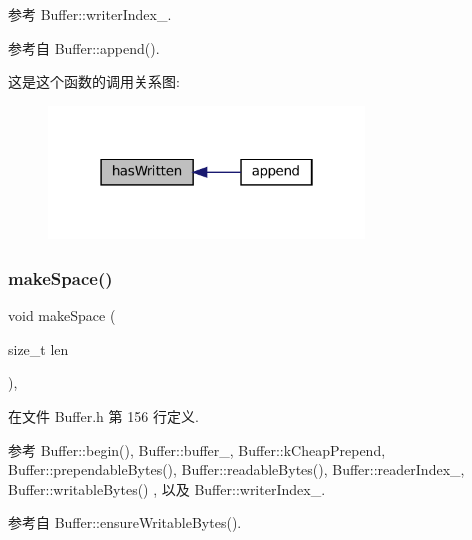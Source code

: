 参考 Buffer\+::writer\+Index\+\_\+.



参考自 Buffer\+::append().

这是这个函数的调用关系图\+:
\nopagebreak
\begin{figure}[H]
\begin{center}
\leavevmode
\includegraphics[width=238pt]{classmuduo_1_1Buffer_ae29d7ca8954d0ec7da6363221c80a245_icgraph}
\end{center}
\end{figure}
\mbox{\label{classmuduo_1_1Buffer_a83d5a5ce302569b35df7743314578791}} 
\subsubsection{\texorpdfstring{make\+Space()}{makeSpace()}}
{\footnotesize\ttfamily void make\+Space (\begin{DoxyParamCaption}\item[{size\+\_\+t}]{len }\end{DoxyParamCaption})\hspace{0.3cm}{\ttfamily [inline]}, {\ttfamily [private]}}



在文件 Buffer.\+h 第 156 行定义.



参考 Buffer\+::begin(), Buffer\+::buffer\+\_\+, Buffer\+::k\+Cheap\+Prepend, Buffer\+::prependable\+Bytes(), Buffer\+::readable\+Bytes(), Buffer\+::reader\+Index\+\_\+, Buffer\+::writable\+Bytes() , 以及 Buffer\+::writer\+Index\+\_\+.



参考自 Buffer\+::ensure\+Writable\+Bytes().

